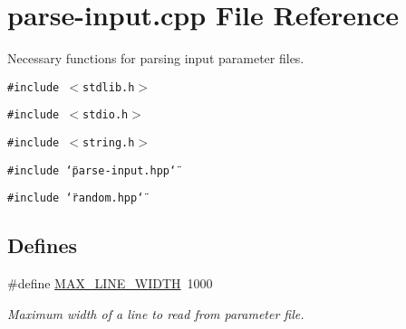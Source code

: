 \hypertarget{parse-input_8cpp}{
\section{parse-input.cpp File Reference}
\label{parse-input_8cpp}
}
Necessary functions for parsing input parameter files. 

{\tt \#include $<$stdlib.h$>$}\par
{\tt \#include $<$stdio.h$>$}\par
{\tt \#include $<$string.h$>$}\par
{\tt \#include \char`\"{}parse-input.hpp\char`\"{}}\par
{\tt \#include \char`\"{}random.hpp\char`\"{}}\par
\subsection*{Defines}
\begin{CompactItemize}
\item 
\#define \hyperlink{parse-input_8cpp_09f908aa6474fe2b1f82b1aaade947f6}{MAX\_\-LINE\_\-WIDTH}~1000
\begin{CompactList}\small\item\em Maximum width of a line to read from parameter file. \item\end{CompactList}\end{CompactItemize}
